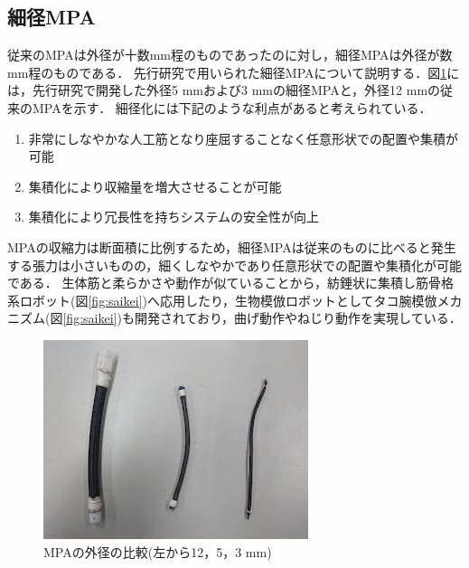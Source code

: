 \subsection{細径MPA}
従来のMPAは外径が十数mm程のものであったのに対し，細径MPAは外径が数mm程のものである．
先行研究\cite{hasegawa}で用いられた細径MPAについて説明する．図\ref{fig:campare}には，先行研究\cite{hasegawa}で開発した外径5 mmおよび3 mmの細径MPAと，外径12 mmの従来のMPAを示す．
細径化には下記のような利点があると考えられている\cite{wakimoto}\cite{1390282680917523328}．
\begin{enumerate}
  \item 非常にしなやかな人工筋となり座屈することなく任意形状での配置や集積が可能
  \item 集積化により収縮量を増大させることが可能
  \item 集積化により冗長性を持ちシステムの安全性が向上
\end{enumerate}
MPAの収縮力は断面積に比例するため，細径MPAは従来のものに比べると発生する張力は小さいものの，細くしなやかであり任意形状での配置や集積化が可能である．
生体筋と柔らかさや動作が似ていることから，紡錘状に集積し筋骨格系ロボット(図\ref{fig:saikei})へ応用したり，生物模倣ロボットとしてタコ腕模倣メカニズム(図\ref{fig:saikei})も開発されており，曲げ動作やねじり動作を実現している\cite{森和也2014}．
\begin{figure}[t]
  \centering
  \includegraphics[scale=0.7]{image/hikaku.jpg}
  \caption{MPAの外径の比較(左から12，5，3 mm)}
  \label{fig:campare}
\end{figure}
%
